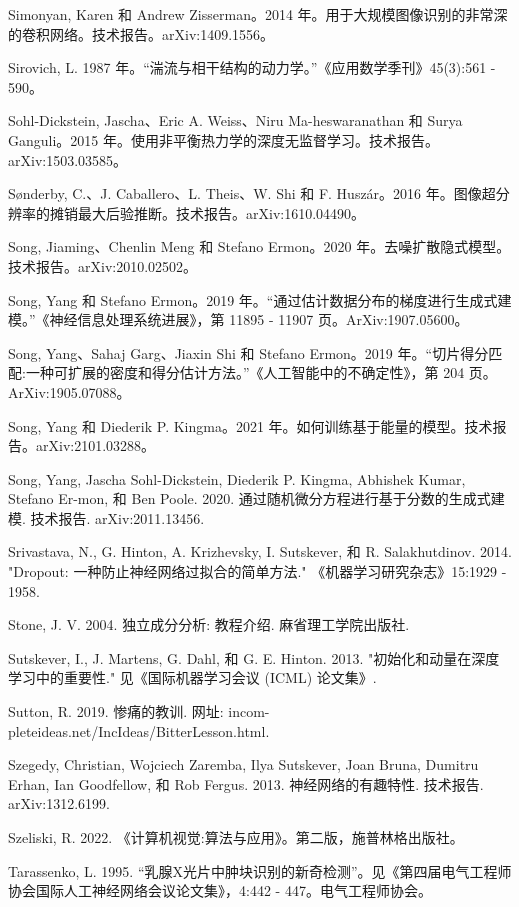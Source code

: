 \documentclass[10pt]{report}
\begin{document}
Simonyan, Karen 和 Andrew Zisserman。2014 年。用于大规模图像识别的非常深的卷积网络。技术报告。arXiv:1409.1556。

Sirovich, L. 1987 年。“湍流与相干结构的动力学。”《应用数学季刊》45(3):561 - 590。

Sohl-Dickstein, Jascha、Eric A. Weiss、Niru Ma-heswaranathan 和 Surya Ganguli。2015 年。使用非平衡热力学的深度无监督学习。技术报告。arXiv:1503.03585。

Sønderby, C.、J. Caballero、L. Theis、W. Shi 和 F. Huszár。2016 年。图像超分辨率的摊销最大后验推断。技术报告。arXiv:1610.04490。

Song, Jiaming、Chenlin Meng 和 Stefano Ermon。2020 年。去噪扩散隐式模型。技术报告。arXiv:2010.02502。

Song, Yang 和 Stefano Ermon。2019 年。“通过估计数据分布的梯度进行生成式建模。”《神经信息处理系统进展》，第 11895 - 11907 页。ArXiv:1907.05600。

Song, Yang、Sahaj Garg、Jiaxin Shi 和 Stefano Ermon。2019 年。“切片得分匹配:一种可扩展的密度和得分估计方法。”《人工智能中的不确定性》，第 204 页。ArXiv:1905.07088。

Song, Yang 和 Diederik P. Kingma。2021 年。如何训练基于能量的模型。技术报告。arXiv:2101.03288。

Song, Yang, Jascha Sohl-Dickstein, Diederik P. Kingma, Abhishek Kumar, Stefano Er-mon, 和 Ben Poole. 2020. 通过随机微分方程进行基于分数的生成式建模. 技术报告. arXiv:2011.13456.

Srivastava, N., G. Hinton, A. Krizhevsky, I. Sutskever, 和 R. Salakhutdinov. 2014. "Dropout: 一种防止神经网络过拟合的简单方法." 《机器学习研究杂志》15:1929 - 1958.

Stone, J. V. 2004. 独立成分分析: 教程介绍. 麻省理工学院出版社.

Sutskever, I., J. Martens, G. Dahl, 和 G. E. Hinton. 2013. "初始化和动量在深度学习中的重要性." 见《国际机器学习会议 (ICML) 论文集》.

Sutton, R. 2019. 惨痛的教训. 网址: incom-pleteideas.net/IncIdeas/BitterLesson.html.

Szegedy, Christian, Wojciech Zaremba, Ilya Sutskever, Joan Bruna, Dumitru Erhan, Ian Goodfellow, 和 Rob Fergus. 2013. 神经网络的有趣特性. 技术报告. arXiv:1312.6199.

Szeliski, R. 2022. 《计算机视觉:算法与应用》。第二版，施普林格出版社。

Tarassenko, L. 1995. “乳腺X光片中肿块识别的新奇检测”。见《第四届电气工程师协会国际人工神经网络会议论文集》，4:442 - 447。电气工程师协会。
\end{document}
